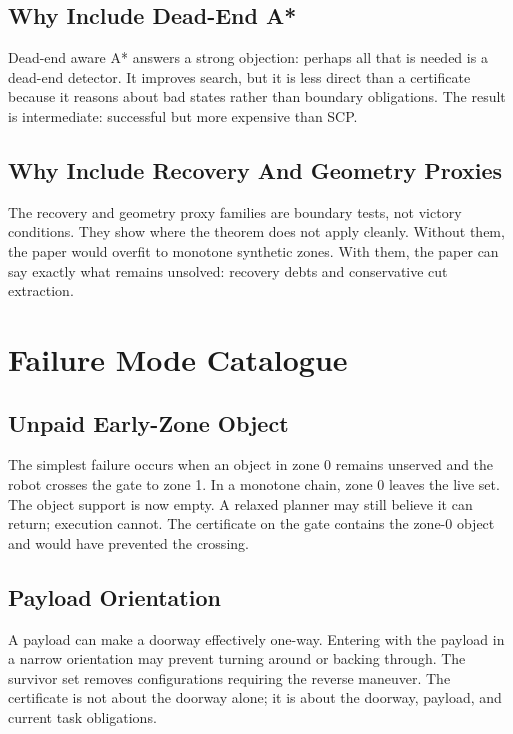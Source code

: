 \documentclass{article}
\begin{document}
\subsection{Why Include Dead-End A*}

Dead-end aware A* answers a strong objection: perhaps all that is needed is a dead-end detector. It improves search, but it is less direct than a certificate because it reasons about bad states rather than boundary obligations. The result is intermediate: successful but more expensive than SCP.

\subsection{Why Include Recovery And Geometry Proxies}

The recovery and geometry proxy families are boundary tests, not victory conditions. They show where the theorem does not apply cleanly. Without them, the paper would overfit to monotone synthetic zones. With them, the paper can say exactly what remains unsolved: recovery debts and conservative cut extraction.

\section{Failure Mode Catalogue}

\subsection{Unpaid Early-Zone Object}

The simplest failure occurs when an object in zone 0 remains unserved and the robot crosses the gate to zone 1. In a monotone chain, zone 0 leaves the live set. The object support is now empty. A relaxed planner may still believe it can return; execution cannot. The certificate on the gate contains the zone-0 object and would have prevented the crossing.

\subsection{Payload Orientation}

A payload can make a doorway effectively one-way. Entering with the payload in a narrow orientation may prevent turning around or backing through. The survivor set removes configurations requiring the reverse maneuver. The certificate is not about the doorway alone; it is about the doorway, payload, and current task obligations.
\end{document}
